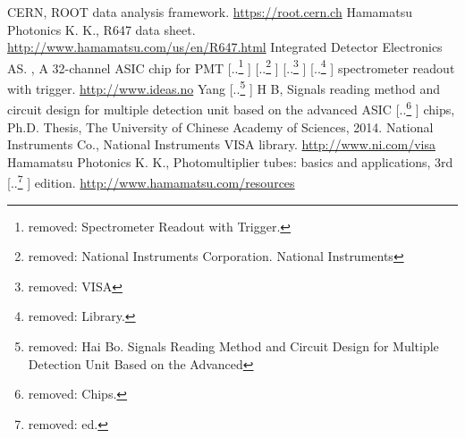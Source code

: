 \documentclass{nst}
\providecommand{\DIFadd}[1]{{\protect\color{blue} \sf #1}} %
\providecommand{\DIFdel}[1]{{\protect\color{red} [..\footnote{removed: #1} ]}} %
\providecommand{\DIFaddbegin}{} %
\providecommand{\DIFaddend}{} %
\providecommand{\DIFdelbegin}{} %
\providecommand{\DIFdelend}{} %
\begin{document}
\begin{thebibliography}{99}
\DIFdelend \DIFaddbegin \DIFadd{CERN,  ROOT data analysis framework. }\href{https://root.cern.ch/}{https://root.cern.ch}
	 \DIFadd{Hamamatsu Photonics K. K., R647 data sheet.
	}\href{http://www.hamamatsu.com/us/en/R647.html}{http://www.hamamatsu.com/us/en/R647.html}
	\DIFaddend {} Integrated Detector Electronics AS.\DIFaddbegin \DIFadd{, }\DIFaddend A 32-channel ASIC chip for PMT \DIFdelbegin \DIFdel{Spectrometer Readout with Trigger. }%
\DIFdel{National Instruments Corporation.  National Instruments }%
\DIFdel{VISA}%
\DIFdel{Library. }%
\DIFdelend \DIFaddbegin \DIFadd{spectrometer readout with trigger. }\href{http://www.ideas.no/products/ide3160-2/}{http://www.ideas.no}
	\DIFaddend {} Yang \DIFdelbegin \DIFdel{Hai Bo. Signals Reading Method and Circuit Design for Multiple Detection Unit Based on the Advanced }\DIFdelend \DIFaddbegin \DIFadd{H B, Signals reading method and circuit design for multiple detection unit based on the advanced }\DIFaddend {ASIC} \DIFdelbegin \DIFdel{Chips. }\DIFdelend \DIFaddbegin \DIFadd{chips, }\DIFaddend Ph.D. Thesis, The University of Chinese Academy of Sciences, 2014.
	\DIFaddbegin {} \DIFadd{National Instruments Co.,  National Instruments }{\DIFadd{VISA}} \DIFadd{library. }\href{http://www.ni.com/visa/}{http://www.ni.com/visa}
	\DIFaddend {} Hamamatsu Photonics K. K., Photomultiplier tubes: basics and applications, 3rd \DIFdelbegin \DIFdel{ed.
	}%
\DIFdelend \DIFaddbegin \DIFadd{edition.
	}\href{http://www.hamamatsu.com/resources/pdf/etd/PMT_handbook_v3aE.pdf}{http://www.hamamatsu.com/resources}
\DIFaddend \end{thebibliography}


%
\end{document}
